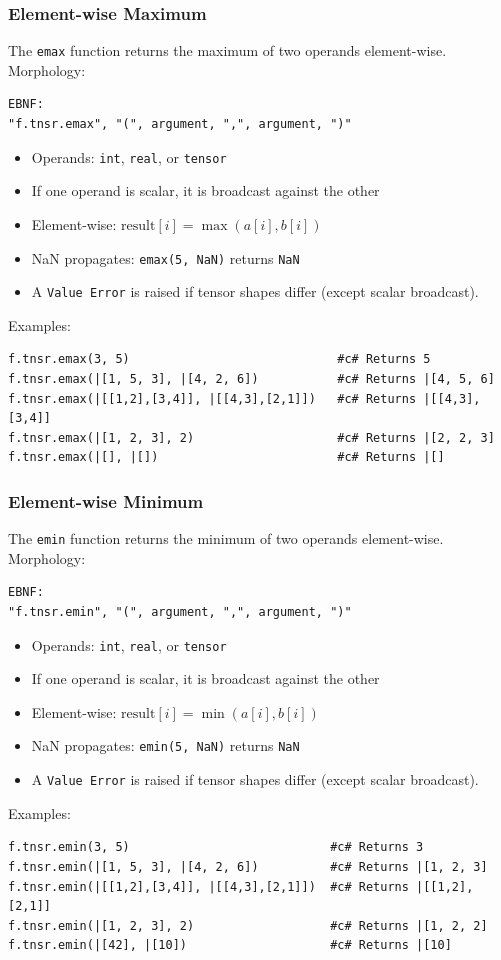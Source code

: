 \subsubsection{Element-wise Maximum}
The \texttt{emax} function returns the maximum of two operands element-wise.\\
Morphology:
\begin{verbatim}
EBNF:
"f.tnsr.emax", "(", argument, ",", argument, ")"
\end{verbatim}
\begin{itemize}
\item Operands: \texttt{int}, \texttt{real}, or \texttt{tensor}
\item If one operand is scalar, it is broadcast against the other
\item Element-wise: $\text{result}[i] = \max(a[i], b[i])$
\item NaN propagates: \texttt{emax(5, NaN)} returns \texttt{NaN}
\item A \texttt{Value Error} is raised if tensor shapes differ (except scalar broadcast).
\end{itemize}
Examples:
\begin{verbatim}
f.tnsr.emax(3, 5)                             #c# Returns 5
f.tnsr.emax(|[1, 5, 3], |[4, 2, 6])           #c# Returns |[4, 5, 6]
f.tnsr.emax(|[[1,2],[3,4]], |[[4,3],[2,1]])   #c# Returns |[[4,3],[3,4]]
f.tnsr.emax(|[1, 2, 3], 2)                    #c# Returns |[2, 2, 3]
f.tnsr.emax(|[], |[])                         #c# Returns |[]
\end{verbatim}

\subsubsection{Element-wise Minimum}
The \texttt{emin} function returns the minimum of two operands element-wise.\\
Morphology:
\begin{verbatim}
EBNF:
"f.tnsr.emin", "(", argument, ",", argument, ")"
\end{verbatim}
\begin{itemize}
\item Operands: \texttt{int}, \texttt{real}, or \texttt{tensor}
\item If one operand is scalar, it is broadcast against the other
\item Element-wise: $\text{result}[i] = \min(a[i], b[i])$
\item NaN propagates: \texttt{emin(5, NaN)} returns \texttt{NaN}
\item A \texttt{Value Error} is raised if tensor shapes differ (except scalar broadcast).
\end{itemize}
Examples:
\begin{verbatim}
f.tnsr.emin(3, 5)                            #c# Returns 3
f.tnsr.emin(|[1, 5, 3], |[4, 2, 6])          #c# Returns |[1, 2, 3]
f.tnsr.emin(|[[1,2],[3,4]], |[[4,3],[2,1]])  #c# Returns |[[1,2],[2,1]]
f.tnsr.emin(|[1, 2, 3], 2)                   #c# Returns |[1, 2, 2]
f.tnsr.emin(|[42], |[10])                    #c# Returns |[10]
\end{verbatim}

